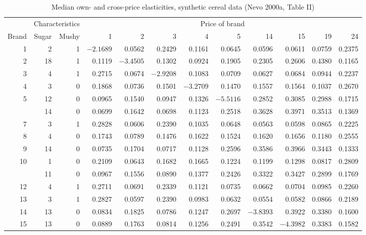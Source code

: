 \begin{table}[htbp]
\centering
\caption{Median own- and cross-price elasticities, synthetic cereal data (Nevo 2000a, Table II)}
\label{tab:08-nevo00-elas}
\footnotesize
\setlength{\tabcolsep}{3.3pt}
\begin{tabular}{@{}rrrrrrrrrrrr@{}}
\toprule
 & \multicolumn{2}{c}{Characteristics} & \multicolumn{9}{c}{Price of brand} \\
\cmidrule(lr){2-3}\cmidrule(l){4-12}
Brand & Sugar & Mushy & 1 & 2 & 3 & 4 & 5 & 14 & 15 & 19 & 24 \\
\midrule
1  & 2  & 1 & $-2.1689$ & 0.0562 & 0.2429 & 0.1161 & 0.0645 & 0.0596 & 0.0611 & 0.0759 & 0.2375 \\
2  & 18 & 1 & 0.1119 & $-3.4505$ & 0.1302 & 0.0924 & 0.1905 & 0.2305 & 0.2606 & 0.4380 & 0.1165 \\
3  & 4  & 1 & 0.2715 & 0.0674 & $-2.9208$ & 0.1083 & 0.0709 & 0.0627 & 0.0684 & 0.0944 & 0.2237 \\
4  & 3  & 0 & 0.1868 & 0.0736 & 0.1501 & $-3.2709$ & 0.1470 & 0.1557 & 0.1564 & 0.1037 & 0.2670 \\
5  & 12 & 0 & 0.0965 & 0.1540 & 0.0947 & 0.1326 & $-5.5116$ & 0.2852 & 0.3085 & 0.2988 & 0.1715 \\
\addlinespace
6  & 14 & 0 & 0.0699 & 0.1642 & 0.0698 & 0.1123 & 0.2518 & 0.3628 & 0.3971 & 0.3513 & 0.1369 \\
7  & 3  & 1 & 0.2828 & 0.0606 & 0.2390 & 0.1035 & 0.0648 & 0.0563 & 0.0598 & 0.0865 & 0.2225 \\
8  & 4  & 0 & 0.1743 & 0.0789 & 0.1476 & 0.1622 & 0.1524 & 0.1620 & 0.1656 & 0.1180 & 0.2555 \\
9  & 14 & 0 & 0.0735 & 0.1704 & 0.0717 & 0.1128 & 0.2596 & 0.3586 & 0.3966 & 0.3443 & 0.1333 \\
10 & 1  & 0 & 0.2109 & 0.0643 & 0.1682 & 0.1665 & 0.1224 & 0.1199 & 0.1298 & 0.0817 & 0.2809 \\
\addlinespace
11 & 11 & 0 & 0.0967 & 0.1556 & 0.0890 & 0.1377 & 0.2426 & 0.3322 & 0.3427 & 0.2899 & 0.1769 \\
12 & 4  & 1 & 0.2711 & 0.0691 & 0.2339 & 0.1121 & 0.0735 & 0.0662 & 0.0704 & 0.0985 & 0.2260 \\
13 & 3  & 1 & 0.2827 & 0.0597 & 0.2390 & 0.0983 & 0.0632 & 0.0554 & 0.0582 & 0.0866 & 0.2189 \\
14 & 13 & 0 & 0.0834 & 0.1825 & 0.0786 & 0.1247 & 0.2697 & $-3.8393$ & 0.3922 & 0.3380 & 0.1600 \\
15 & 13 & 0 & 0.0889 & 0.1763 & 0.0814 & 0.1256 & 0.2491 & 0.3542 & $-4.3982$ & 0.3383 & 0.1582 \\

\end{tabular}
\end{table}
